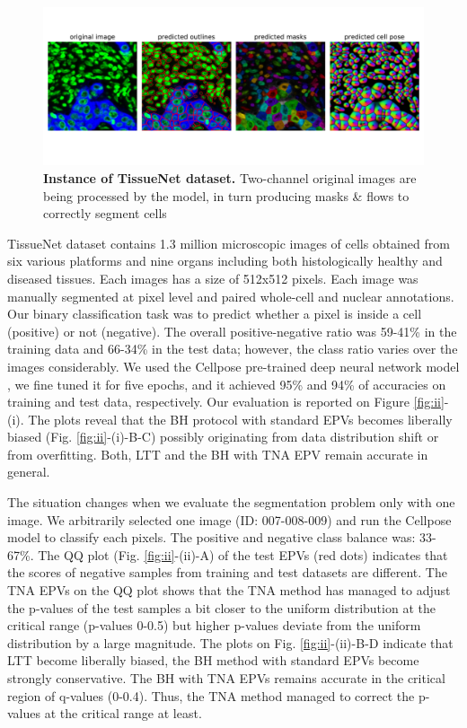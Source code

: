 \documentclass{article}
\begin{document}
\begin{figure}[h!]
    \centering
	\includegraphics[width=5in]{img/tissuenet.pdf}
	\caption{{\bf Instance of TissueNet dataset.} Two-channel original images are being processed by the model, in turn producing masks \& flows to correctly segment cells}
	\label{fig:tissue_example}
\end{figure} 

TissueNet dataset contains 1.3 million microscopic images of cells obtained from six various platforms and nine organs including both histologically healthy and diseased tissues. Each images has a size of 512x512 pixels. Each image was manually segmented at pixel level and paired whole-cell and nuclear annotations. Our binary classification task was to predict whether a pixel is inside a cell (positive) or not (negative). The overall positive-negative ratio was 59-41\% in the training data and 66-34\% in the test data; however, the class ratio varies over the images considerably. We used the Cellpose pre-trained deep neural network model \cite{cellpose}, we fine tuned it for five epochs, and it achieved 95\% and 94\% of accuracies  on training and test data, respectively. Our evaluation is reported on Figure \ref{fig:ii}-(i). The plots reveal that the BH protocol with standard EPVs becomes liberally biased (Fig. \ref{fig:ii}-(i)-B-C) possibly originating from data distribution shift or from overfitting. Both, LTT and the BH with TNA EPV remain accurate in general. 

The situation changes when we evaluate the segmentation problem only with one image. We arbitrarily selected one image (ID: 007-008-009) and run the Cellpose model to classify each pixels. The positive and negative class balance was: 33-67\%. The QQ plot (Fig. \ref{fig:ii}-(ii)-A) of the test EPVs (red dots) indicates that the scores of negative samples from training and test datasets are different. The TNA EPVs on the QQ plot shows that the TNA method has managed to adjust the p-values of the test samples a bit closer to the uniform distribution at the critical range (p-values 0-0.5) but higher p-values deviate from the uniform distribution by a large magnitude. The plots on Fig. \ref{fig:ii}-(ii)-B-D indicate that LTT become liberally biased, the BH method with standard EPVs become strongly conservative. The BH with TNA EPVs remains accurate in the critical region of q-values (0-0.4). Thus, the TNA method managed to correct the p-values at the critical range at least. 
\end{document}
